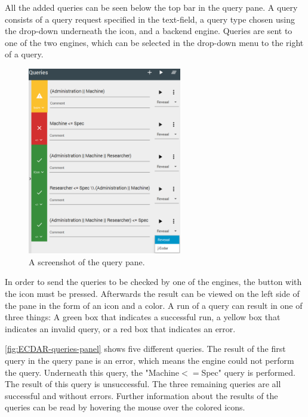 All the added queries can be seen below the top bar in the query pane. A query consists of a query request specified in the text-field, a query type chosen using the drop-down underneath the icon, and a backend engine. 
Queries are sent to one of the two engines, which can be selected in the drop-down menu to the right of a query. 
\begin{figure}[H]
    \centering
    \includegraphics[width=0.6\textwidth]{common/figures/right-panel.png}
    \caption{A screenshot of the query pane.}
    \label{fig:ECDAR-queries-panel}
\end{figure}

In order to send the queries to be checked by one of the engines, the button with the  icon must be pressed.
Afterwards the result can be viewed on the left side of the pane in the form of an icon and a color.
A run of a query can result in one of three things: A green box that indicates a successful run, a yellow box that indicates an invalid query, or a red box that indicates an error.

\autoref{fig:ECDAR-queries-panel} shows five different queries. 
The result of the first query in the query pane is an error, which means the engine could not perform the query. 
Underneath this query, the "Machine$<=$Spec" query is performed. The result of this query is unsuccessful.
The three remaining queries are all successful and without errors.
Further information about the results of the queries can be read by hovering the mouse over the colored icons.



